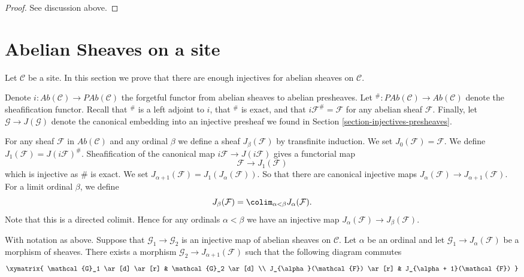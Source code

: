 \begin{proof}
See discussion above.
\end{proof}












\section{Abelian Sheaves on a site}
\label{section-injectives-sheaves}

\noindent
Let $\mathcal{C}$ be a site. In this section we prove that there are
enough injectives for abelian sheaves on $\mathcal{C}$.

\medskip\noindent
Denote
$i : \textit{Ab}(\mathcal{C}) \longrightarrow \textit{PAb}(\mathcal{C})$
the forgetful functor from abelian sheaves to abelian presheaves.
Let
${}^\# : \textit{PAb}(\mathcal{C}) \longrightarrow \textit{Ab}(\mathcal{C})$
denote the sheafification functor. Recall that ${}^\#$ is a left adjoint
to $i$, that ${}^\#$ is exact, and that $i\mathcal{F}^\# = \mathcal{F}$
for any abelian sheaf $\mathcal{F}$. Finally, let
$\mathcal{G} \to J(\mathcal{G})$ denote the canonical
embedding into an injective presheaf we found in
Section \ref{section-injectives-presheaves}.

\medskip\noindent
For any sheaf $\mathcal{F}$ in $\textit{Ab}(\mathcal{C})$ and
any ordinal $\beta$ we define a sheaf
$J_\beta(\mathcal{F})$ by transfinite induction.
We set $J_0(\mathcal{F}) = \mathcal{F}$.
We define $J_1(\mathcal{F}) = J(i\mathcal{F})^\#$.
Sheafification of the canonical map $i\mathcal{F} \to J(i\mathcal{F})$
gives a functorial map
$$
\mathcal{F} \longrightarrow J_1(\mathcal{F})
$$
which is injective as $\#$ is exact. We set
$J_{\alpha + 1}(\mathcal{F}) = J_1(J_\alpha(\mathcal{F}))$.
So that there are canonical injective maps
$J_\alpha(\mathcal{F}) \to J_{\alpha + 1}(\mathcal{F})$.
For a limit ordinal $\beta$, we define
$$
J_\beta(\mathcal{F}) = \colim_{\alpha < \beta} J_\alpha(\mathcal{F}).
$$
Note that this is a directed colimit. Hence for any ordinals $\alpha < \beta$
we have an injective map $J_\alpha(\mathcal{F}) \to J_\beta(\mathcal{F})$.

\begin{lemma}
\label{lemma-map-into-next-one}
With notation as above.
Suppose that $\mathcal{G}_1 \to \mathcal{G}_2$ is an injective
map of abelian sheaves on $\mathcal{C}$. Let $\alpha$ be an ordinal
and let $\mathcal{G}_1 \to J_\alpha(\mathcal{F})$ be a morphism
of sheaves. There exists a morphism $\mathcal{G}_2 \to
J_{\alpha + 1}(\mathcal{F})$ such that the following diagram commutes
$$
\xymatrix{
\mathcal{G}_1 \ar[d] \ar[r] & \mathcal{G}_2 \ar[d] \\
J_{\alpha}(\mathcal{F}) \ar[r] & J_{\alpha + 1}(\mathcal{F}) }
$$
\end{lemma}

